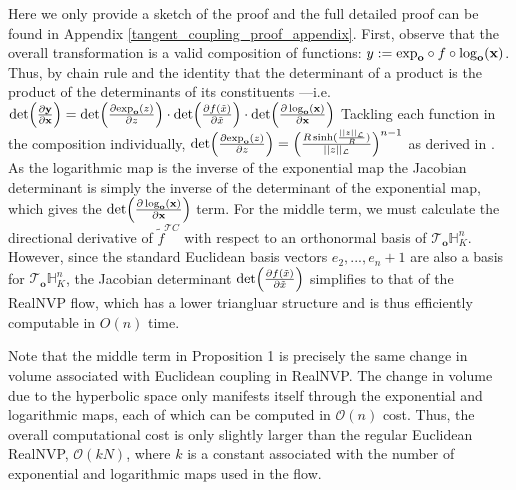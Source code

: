 \begin{proofsketch}
Here we only provide a sketch of the proof and the full detailed proof can be found in Appendix \ref{tangent_coupling_proof_appendix}. First, observe  that the overall transformation  is a valid composition of functions: $y := \textnormal{exp}_{\textbf{o}} \circ f\circ \log_{\textbf{o}}(\textbf{x})$. Thus, by chain rule and the identity that the determinant of a product is the product of the determinants of its constituents ---i.e.  $\textnormal{det}\Big (\frac{\partial \textbf{y}}{\partial \textbf{x}}\Big) =  \textnormal{det}\Big (\frac{\partial \textnormal{exp}_{\textbf{o}}(z)}{\partial z}\Big) \cdot \textnormal{det}\Big (\frac{\partial f(\tilde{x})}{\partial \tilde{x}}\Big) \cdot  \textnormal{det}\Big (\frac{\partial \log_{\textbf{o}}(\textbf{x})}{\partial \textbf{x}}\Big)$ Tackling each function in the composition individually, $\textnormal{det}\Big (\frac{\partial \textnormal{exp}_{\textbf{o}}(z)}{\partial z}\Big) = \Big(\frac{R\sinh(\frac{||z||_{\mathcal{L}}}{R})}{||z||_{\mathcal{L}}}\Big)^{n-1}$ as derived in \cite{skopek2019mixed}. As the logarithmic map is the inverse of the exponential map the Jacobian determinant is simply the inverse of the determinant of the exponential map, which gives the $\textnormal{det}\Big (\frac{\partial \log_{\textbf{o}}(\textbf{x})}{\partial \textbf{x}}\Big)$ term. 
For the middle term, we must calculate the directional derivative of $\tilde{f}^{\mathcal{T}C}$ with respect to an orthonormal basis of $\mathcal{T}_{\textbf{o}}\mathbb{H}^{n}_K$.
However, since the standard Euclidean basis vectors $e_2, ..., e_n+1$ are also a basis for $\mathcal{T}_{\textbf{o}}\mathbb{H}^{n}_K$, the Jacobian determinant $\textnormal{det}\Big (\frac{\partial f(\tilde{x})}{\partial \tilde{x}}\Big)$ simplifies to that of the RealNVP flow, which has a lower triangluar structure and is thus efficiently computable in $O(n)$ time.
\end{proofsketch}
Note that the middle term in Proposition 1 is precisely the same change in volume associated with Euclidean coupling in RealNVP.
The change in volume due to the hyperbolic space only manifests itself through the exponential and logarithmic maps, each of which can be computed in $\mathcal{O}(n)$ cost. Thus, the overall computational cost is only slightly larger than the regular Euclidean RealNVP, $\mathcal{O}(kN)$, where $k$ is a constant associated with the number of exponential and logarithmic maps used in the flow.

